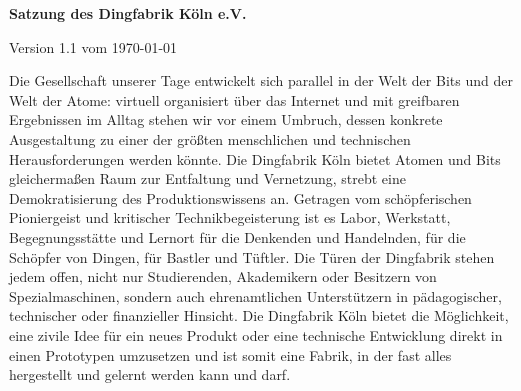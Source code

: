 \documentclass[12pt,ngerman]{scrartcl}
\begin{document}
\begin{center}
\Huge\textbf{Satzung des Dingfabrik Köln e.V.}\vspace*{1cm}

\Large{Version 1.1 vom \today}
\end{center}\vspace*{1cm}

Die Gesellschaft unserer Tage entwickelt sich parallel in der Welt der Bits und der Welt der Atome: virtuell organisiert über das Internet und mit greifbaren Ergebnissen im Alltag stehen wir vor einem Umbruch, dessen konkrete Ausgestaltung zu einer der größten menschlichen und technischen Herausforderungen werden könnte. Die Dingfabrik Köln bietet Atomen und Bits gleichermaßen Raum zur Entfaltung und Vernetzung, strebt eine Demokratisierung des Produktionswissens an. Getragen vom schöpferischen Pioniergeist und kritischer Technikbegeisterung ist es Labor, Werkstatt, Begegnungsstätte und Lernort für die Denkenden und Handelnden, für die Schöpfer von Dingen, für Bastler und Tüftler. Die Türen der Dingfabrik stehen jedem offen, nicht nur Studierenden, Akademikern oder Besitzern von Spezialmaschinen, sondern auch ehrenamtlichen Unterstützern in pädagogischer, technischer oder finanzieller Hinsicht. Die Dingfabrik Köln bietet die Möglichkeit, eine zivile Idee für ein neues Produkt oder eine technische Entwicklung direkt in einen Prototypen umzusetzen und ist somit eine Fabrik, in der fast alles hergestellt und gelernt werden kann und darf.
\end{document}
